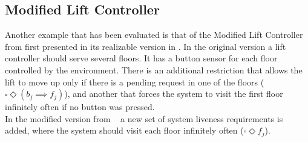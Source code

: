 \subsection{Modified Lift Controller}
Another example that has been evaluated is that
of the Modified Lift Controller from 
\cite{DBLP:conf/fmcad/AlurMT13} first presented in
its realizable version in 
\cite{DBLP:journals/jcss/BloemJPPS12}.
In the original version a lift controller should serve
several floors.  It has a button sensor for each floor 
controlled by the environment.  There is an additional 
restriction that allows the lift to move up only if there
is a pending request in one of the floors 
($\square \Diamond (b_j \implies f_j)$), and another that
forces the system to visit the first floor infinitely
often if no button was pressed.\\
In the modified version from ~\cite{DBLP:conf/fmcad/AlurMT13} a new set of system liveness 
requirements is added, where the system should 
visit each floor infinitely often ($\square \Diamond f_j$).


